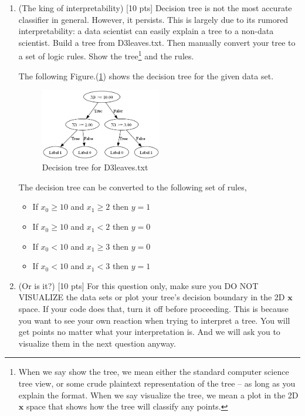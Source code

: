 \documentclass[a4paper]{article}
\theoremstyle{definition}
\def\x{\mathbf x}
\newenvironment{soln}{
    \leavevmode\color{blue}\ignorespaces
}{}
\begin{document}
\begin{enumerate}
\begin{soln}
\end{soln}

\item (The king of interpretability)  [10 pts] Decision tree is not the most accurate classifier in general.  However, it persists.  This is largely due to its rumored interpretability: a data scientist can easily explain a tree to a non-data scientist.  Build a tree from D3leaves.txt.  Then manually convert your tree to a set of logic rules.  Show the tree\footnote{When we say show the tree, we mean either the standard computer science tree view, or some crude plaintext representation of the tree -- as long as you explain the format.  When we say visualize the tree, we mean a plot in the 2D $\x$ space that shows how the tree will classify any points.} and the rules. \\

\begin{soln}
  The following Figure.(\ref{fig:q2_4}) shows the decision tree for the given data set. \\
  \begin{figure}[H]
    \centering
    \includegraphics[width=0.5\textwidth]{d3_vis.png}
    \caption{Decision tree for D3leaves.txt}
    \label{fig:q2_4}
  \end{figure}

  The decision tree can be converted to the following set of rules,
  \begin{itemize}
    \item If $x_0 \ge 10$ and $x_1 \ge 2$ then $y=1$
    \item If $x_0 \ge 10$ and $x_1 < 2$ then $y=0$
    \item If $x_0 < 10$ and $x_1 \ge 3$ then $y=0$
    \item If $x_0 < 10$ and $x_1 < 3$ then $y=1$
  \end{itemize}

\end{soln}

\item (Or is it?)  [10 pts] For this question only, make sure you DO NOT VISUALIZE the data sets or plot your tree's decision boundary in the 2D $\x$ space.  If your code does that, turn it off before proceeding.  This is because you want to see your own reaction when trying to interpret a tree.  You will get points no matter what your interpretation is.
And we will ask you to visualize them in the next question anyway.
  \begin{itemize}
  

\end{itemize}
\end{enumerate}
\end{document}
